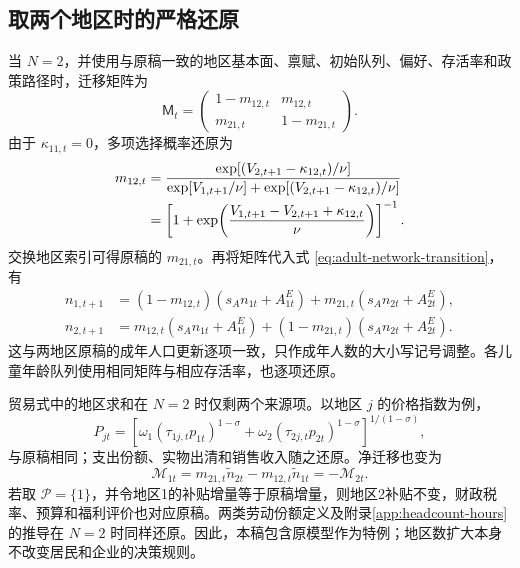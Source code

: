 \documentclass[UTF8,a4paper,zihao=-4,fontset=windows]{ctexart}
\numberwithin{equation}{section}
\begin{document}
\subsection{取两个地区时的严格还原}
当 $N=2$，并使用与原稿一致的地区基本面、禀赋、初始队列、偏好、存活率和政策路径时，迁移矩阵为
\begin{equation}
  \mathsf M_t=
  \begin{pmatrix}
    1-m_{12,t} & m_{12,t}\\
    m_{21,t} & 1-m_{21,t}
  \end{pmatrix}.
  \label{eq:app-two-region-migration-matrix}
\end{equation}
由于 $\kappa_{11,t}=0$，多项选择概率还原为
\begin{align}
  m_{12,t}
   &=\frac{\exp[(V_{2,t+1}-\kappa_{12,t})/\nu]}
       {\exp[V_{1,t+1}/\nu]
          +\exp[(V_{2,t+1}-\kappa_{12,t})/\nu]}
          \notag\\
   &=\left[1+\exp\!\left(
      \frac{V_{1,t+1}-V_{2,t+1}+\kappa_{12,t}}{\nu}
      \right)\right]^{-1}.
  \label{eq:app-two-region-logit}
\end{align}
交换地区索引可得原稿的 $m_{21,t}$。再将矩阵代入式 \eqref{eq:adult-network-transition}，有
\begin{align}
  n_{1,t+1}
   &=(1-m_{12,t})(s_An_{1t}+A^E_{1t})
          +m_{21,t}(s_An_{2t}+A^E_{2t}),\\
  n_{2,t+1}
   &=m_{12,t}(s_An_{1t}+A^E_{1t})
          +(1-m_{21,t})(s_An_{2t}+A^E_{2t}).
  \label{eq:app-two-region-adult-update}
\end{align}
这与两地区原稿的成年人口更新逐项一致，只作成年人数的大小写记号调整。各儿童年龄队列使用相同矩阵与相应存活率，也逐项还原。

贸易式中的地区求和在 $N=2$ 时仅剩两个来源项。以地区 $j$ 的价格指数为例，
\begin{equation}
  P_{jt}=
  \left[\omega_1(\tau_{1j,t}p_{1t})^{1-\sigma}
       +\omega_2(\tau_{2j,t}p_{2t})^{1-\sigma}\right]^{1/(1-\sigma)},
  \label{eq:app-two-region-price-index}
\end{equation}
与原稿相同；支出份额、实物出清和销售收入随之还原。净迁移也变为
\begin{equation}
  \mathcal M_{1t}
     =m_{21,t}\widetilde n_{2t}
       -m_{12,t}\widetilde n_{1t}
     =-\mathcal M_{2t}.
  \label{eq:app-two-region-net-migration}
\end{equation}
若取 $\mathcal P=\{1\}$，并令地区1的补贴增量等于原稿增量，则地区2补贴不变，财政税率、预算和福利评价也对应原稿。两类劳动份额定义及附录\ref{app:headcount-hours} 的推导在 $N=2$ 时同样还原。因此，本稿包含原模型作为特例；地区数扩大本身不改变居民和企业的决策规则。
\end{document}
